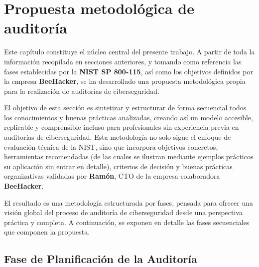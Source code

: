 \documentclass[a4paper, 11pt]{article}
\begin{document}
\clearpage
\thispagestyle{nohead}


\section{Propuesta metodológica de auditoría}

\par\vspace{0.5cm}
Este capítulo constituye el núcleo central del presente trabajo. A partir de toda la información recopilada en secciones anteriores, y tomando como referencia las fases establecidas por la \textbf{NIST SP 800-115}, así como los objetivos definidos por la empresa \textbf{BeeHacker}, se ha desarrollado una propuesta metodológica propia para la realización de auditorías de ciberseguridad.

\par\vspace{0.5cm}
El objetivo de esta sección es sintetizar y estructurar de forma secuencial todos los conocimientos y buenas prácticas analizadas, creando así un modelo accesible, replicable y comprensible incluso para profesionales sin experiencia previa en auditorías de ciberseguridad. Esta metodología no solo sigue el enfoque de evaluación técnica de la NIST, sino que incorpora objetivos concretos, herramientas recomendadas (de las cuales se ilustran mediante ejemplos prácticos su aplicación sin entrar en detalle), criterios de decisión y buenas prácticas organizativas validadas por \textbf{Ramón}, CTO de la empresa colaboradora \textbf{BeeHacker}.

\par\vspace{0.5cm}
El resultado es una metodología estructurada por fases, pensada para ofrecer una visión global del proceso de auditoría de ciberseguridad desde una perspectiva práctica y completa. A continuación, se exponen en detalle las fases secuenciales que componen la propuesta.


\par\vspace{0.5cm}

\subsection{Fase de Planificación de la Auditoría}
\par\vspace{0.5cm}
\end{document}

